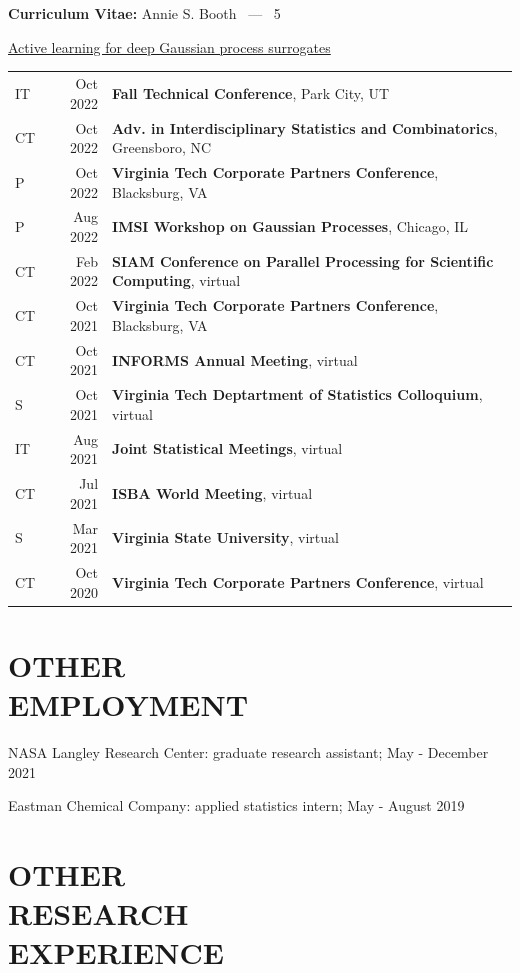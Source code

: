 \documentclass[margin,line,11pt]{res}
\begin{document}
\begin{resume}
\pagebreak
\section{}
\hfill {\bf Curriculum Vitae:} Annie S. Booth \  --- \  5
\medskip

\underline{Active learning for deep Gaussian process surrogates}\\
\begin{tabular}{lrl}
IT & Oct 2022 & {\bf Fall Technical Conference}, Park City, UT \\
CT & Oct 2022 & {\bf Adv. in Interdisciplinary Statistics and Combinatorics}, Greensboro, NC \\
P & Oct 2022 & {\bf Virginia Tech Corporate Partners Conference}, Blacksburg, VA \\
P & Aug 2022 & {\bf IMSI Workshop on Gaussian Processes}, Chicago, IL \\
CT & Feb 2022 & {\bf SIAM Conference on Parallel Processing for Scientific Computing}, virtual \\
CT & Oct 2021 & {\bf Virginia Tech Corporate Partners Conference}, Blacksburg, VA \\
CT & Oct 2021 & {\bf INFORMS Annual Meeting}, virtual \\
S & Oct 2021 & {\bf Virginia Tech Deptartment of Statistics Colloquium}, virtual \\
IT & Aug 2021 & {\bf Joint Statistical Meetings}, virtual \\
CT& Jul 2021 & {\bf ISBA World Meeting}, virtual \\
S & Mar 2021 & {\bf Virginia State University}, virtual \\
CT & Oct 2020 & {\bf Virginia Tech Corporate Partners Conference}, virtual \\
\end{tabular}

\medskip
\section{OTHER \\ EMPLOYMENT}

{\sc NASA Langley Research Center}: graduate research assistant; May - December 2021

{\sc Eastman Chemical Company}: applied statistics intern; May - August 2019

\medskip
\section{OTHER \\ RESEARCH \\EXPERIENCE}


\end{resume}
\end{document}
